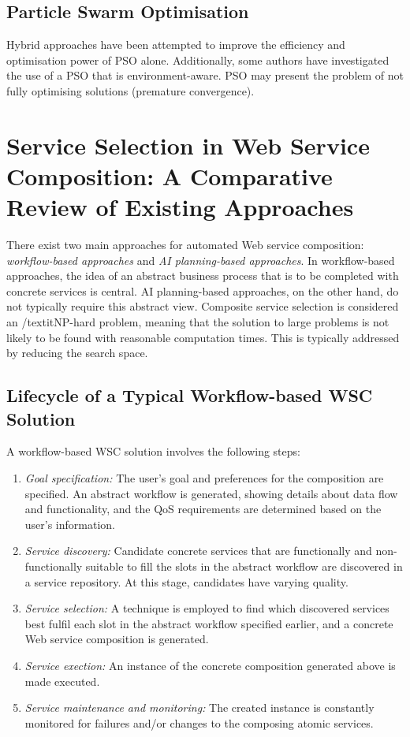\documentclass[a4paper,10pt]{article}
\begin{document}
\subsection{Particle Swarm Optimisation}
Hybrid approaches have been attempted to improve the efficiency and optimisation power of PSO alone. Additionally, some 
authors have investigated the use of a PSO that is environment-aware. PSO may present the problem of not fully optimising
solutions (premature convergence).

\section{Service Selection in Web Service Composition: A Comparative Review of Existing Approaches \cite{moghaddam2014service}}
There exist two main approaches for automated Web service composition: \textit{workflow-based approaches}
and \textit{AI planning-based approaches}. In workflow-based approaches, the idea of an abstract business process that is to be
completed with concrete services is central. AI planning-based approaches, on the other hand, do not typically require this
abstract view. Composite service selection is considered an /textit{NP-hard problem}, meaning that the solution to large problems
is not likely to be found with reasonable computation times. This is typically addressed by reducing the search space.


\subsection{Lifecycle of a Typical Workflow-based WSC Solution}
A workflow-based WSC solution involves the following steps:

\begin{enumerate}
 \item \textit{Goal specification:} The user's goal and preferences for the composition are specified. An abstract workflow is generated,
 showing details about data flow and functionality, and the QoS requirements are determined based on the user's information.
 \item \textit{Service discovery:} Candidate concrete services that are functionally and non-functionally suitable to fill the slots
 in the abstract workflow are discovered in a service repository. At this stage, candidates have varying quality.
 \item \textit{Service selection:} A technique is employed to find which discovered services best fulfil each slot in the abstract
 workflow specified earlier, and a concrete Web service composition is generated.
 \item \textit{Service exection:} An instance of the concrete composition generated above is made executed.
 \item \textit{Service maintenance and monitoring:} The created instance is constantly monitored for failures and/or changes
 to the composing atomic services.
\end{enumerate}
\end{document}
